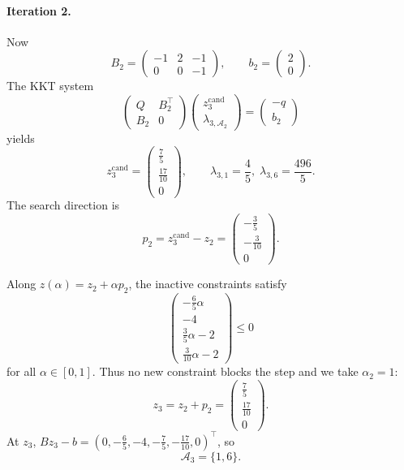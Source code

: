 \documentclass[11pt]{article}
\begin{document}
\paragraph{Iteration 2.}
Now
\[
B_2 = \begin{pmatrix}
-1 & 2 & -1\\
 0 & 0 & -1
\end{pmatrix},\qquad
b_2 = \begin{pmatrix}2\\0\end{pmatrix}.
\]
The KKT system
\[
\begin{pmatrix}
Q & B_2^\top\\
B_2 & 0
\end{pmatrix}
\begin{pmatrix}
z_3^{\text{cand}}\\ \lambda_{3,\mathcal{A}_2}
\end{pmatrix}
=
\begin{pmatrix}
-q\\ b_2
\end{pmatrix}
\]
yields
\[
z_3^{\text{cand}} =
\begin{pmatrix}
\frac{7}{5}\\[0.1em]\frac{17}{10}\\[0.1em]0
\end{pmatrix},\qquad
\lambda_{3,1} = \frac{4}{5},\;
\lambda_{3,6} = \frac{496}{5}.
\]
The search direction is
\[
p_2 = z_3^{\text{cand}} - z_2
    = \begin{pmatrix}-\tfrac{3}{5}\\[0.1em]-\tfrac{3}{10}\\[0.1em]0\end{pmatrix}.
\]

Along \(z(\alpha)=z_2+\alpha p_2\), the inactive constraints satisfy
\[
\begin{pmatrix}
-\tfrac{6}{5}\alpha\\[0.1em]-4\\[0.1em]\tfrac{3}{5}\alpha-2\\[0.1em]\tfrac{3}{10}\alpha-2
\end{pmatrix}\le 0
\]
for all \(\alpha\in[0,1]\). Thus no new constraint blocks the step and we take
\(\alpha_2 = 1\):
\[
z_3 = z_2 + p_2 =
\begin{pmatrix}
\frac{7}{5}\\[0.1em]\frac{17}{10}\\[0.1em]0
\end{pmatrix}.
\]
At \(z_3\),
\(
Bz_3 - b = (0,-\tfrac{6}{5},-4,-\tfrac{7}{5},-\tfrac{17}{10},0)^\top
\),
so
\[
\mathcal{A}_3 = \{1,6\}.
\]
\end{document}
